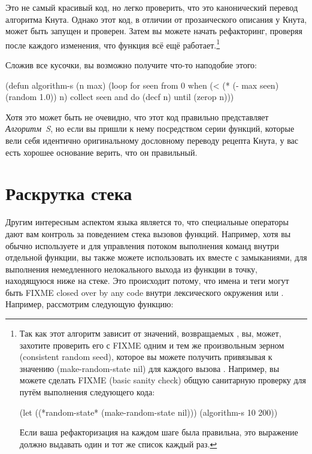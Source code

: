 Это не самый красивый код, но легко проверить, что это канонический перевод алгоритма
Кнута. Однако этот код, в отличии от прозаического описания у Кнута, может быть запущен и
проверен. Затем вы можете начать рефакторинг, проверяя после каждого изменения, что
функция всё ещё работает.\footnote{Так как этот алгоритм зависит от значений, возвращаемых
  , вы, может, захотите проверить его с FIXME одним и тем же произвольным
  зерном (consistent random seed), которое вы можете получить привязывая
   к значению (make-random-state nil) для каждого вызова
  . Например, вы можете сделать FIXME (basic sanity check) общую
  санитарную проверку для  путём выполнения следующего кода:

\begin{myverb}
(let ((*random-state* (make-random-state nil))) (algorithm-s 10 200))
\end{myverb}

Если ваша рефакторизация на каждом шаге была правильна, это выражение должно выдавать один
и тот же список каждый раз.}

Сложив все кусочки, вы возможно получите что-то наподобие этого:

\begin{myverb}
(defun algorithm-s (n max)
  (loop for seen from 0
     when (< (* (- max seen) (random 1.0)) n)
     collect seen and do (decf n)
     until (zerop n)))
\end{myverb}

Хотя это может быть не очевидно, что этот код правильно представляет \textit{Алгоритм~S},
но если вы пришли к нему посредством серии функций, которые вели себя идентично
оригинальному дословному переводу рецепта Кнута, у вас есть хорошее основание верить, что
он правильный.

\section{Раскрутка стека}

Другим интересным аспектом языка является то, что специальные операторы дают вам контроль
за поведением стека вызовов функций. Например, хотя вы обычно используете  и
 для управления потоком выполнения команд внутри отдельной функции, вы также
можете использовать их вместе с замыканиями, для выполнения немедленного нелокального
выхода из функции в точку, находящуюся ниже на стеке. Это происходит потому, что имена
 и теги  могут быть FIXME closed over by any code внутри
лексического окружения  или . Например, рассмотрим следующую
функцию:

